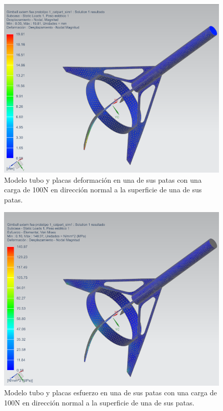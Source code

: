 \begin{figure}[htb]
    \centering
    \includegraphics[height=0.3\pdfpageheight]{fig/fea/tuboplaca4.png}
    \caption{Modelo tubo y placas deformación en una de sus patas con una carga de 100N en dirección normal a la superficie de una de sus patas.}
    \label{fig:fea/tuboplaca4}
\end{figure}

\begin{figure}[htb]
    \centering
    \includegraphics[height=0.3\pdfpageheight]{fig/fea/tuboplaca5.png}
    \caption{Modelo tubo y placas esfuerzo en una de sus patas con una carga de 100N en dirección normal a la superficie de una de sus patas.}
    \label{fig:fea/tuboplaca5}
\end{figure}


